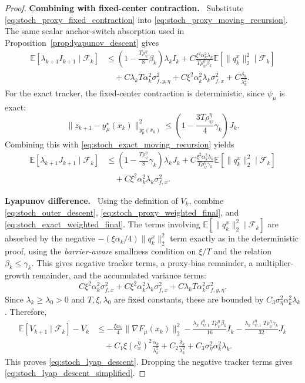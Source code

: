 \documentclass{article}
\newcommand{\proofstep}[1]{\par\smallskip\noindent\textbf{#1}\ }
\begin{document}
\begin{proof}
\proofstep{Combining with fixed-center contraction.}
Substitute \eqref{eq:stoch_proxy_fixed_contraction} into
\eqref{eq:stoch_proxy_moving_recursion}. The same scalar anchor-switch absorption used in
Proposition~\ref{prop:lyapunov_descent} gives
\begin{align}
\mathbb E[\lambda_{k+1}I_{k+1}\mid \mathcal F_k]
&\le
\left(1-\frac{T\rho_\psi^\eta}{8}\beta_k\right)\lambda_k I_k
+
C\frac{\xi^2\alpha_k^2\lambda_k}{T\rho_\psi^\eta\beta_k}
\mathbb E[\|q_k^x\|_2^2\mid\mathcal F_k]
\nonumber\\
&\quad
+
C\lambda_k T\alpha_k^2\sigma_{f,y,\eta}^2
+
C\xi^2\alpha_k^2\lambda_k\sigma_{f,x}^2
+
C\frac{\delta_k}{\lambda_k^2}.
\label{eq:stoch_proxy_weighted_final}
\end{align}
For the exact tracker, the fixed-center contraction is deterministic, since \(\psi_\mu\) is exact:
\[
\|z_{k+1}-y_\mu^\star(x_k)\|_{y_\mu^\star(x_k)}^2
\le
\left(1-\frac{3T\rho_\psi^\eta}{4}\gamma_k\right)J_k .
\]
Combining this with \eqref{eq:stoch_exact_moving_recursion} yields
\begin{align}
\mathbb E[\lambda_{k+1}J_{k+1}\mid \mathcal F_k]
&\le
\left(1-\frac{T\rho_\psi^\eta}{8}\gamma_k\right)\lambda_k J_k
+
C\frac{\xi^2\alpha_k^2\lambda_k}{T\rho_\psi^\eta\gamma_k}
\mathbb E[\|q_k^x\|_2^2\mid\mathcal F_k]
\nonumber\\
&\quad
+
C\xi^2\alpha_k^2\lambda_k\sigma_{f,x}^2 .
\label{eq:stoch_exact_weighted_final}
\end{align}

\proofstep{Lyapunov difference.}
Using the definition of \(V_k\), combine
\eqref{eq:stoch_outer_descent}, \eqref{eq:stoch_proxy_weighted_final}, and
\eqref{eq:stoch_exact_weighted_final}. The terms involving
\(\mathbb E[\|q_k^x\|_2^2\mid\mathcal F_k]\) are absorbed by the negative
\(-(\xi\alpha_k/4)\|q_k^x\|_2^2\) term exactly as in the deterministic proof, using the
\textit{barrier-aware} smallness condition on \(\xi/T\) and the relation \(\beta_k\le\gamma_k\). This gives
negative tracker terms, a proxy-bias remainder, a multiplier-growth remainder, and the accumulated
variance terms:
\[
C\xi^2\alpha_k^2\sigma_{f,x}^2
+
C\xi^2\alpha_k^2\lambda_k\sigma_{f,x}^2
+
C\lambda_kT\alpha_k^2\sigma_{f,y,\eta}^2 .
\]
Since \(\lambda_k\ge\lambda_0>0\) and \(T,\xi,\lambda_0\) are fixed constants, these are bounded by
\(C_3\sigma_\eta^2\alpha_k^2\lambda_k\). Therefore,
\begin{align*}
\mathbb E[V_{k+1}\mid \mathcal F_k]-V_k
&\le
-\frac{\xi\alpha_k}{4}\|\nabla F_\mu(x_k)\|_2^2
-\frac{\lambda_k\ell_{\psi,1}^\eta T\rho_\psi^\eta\beta_k}{16}I_k
-\frac{\lambda_k\ell_{\psi,1}^\eta T\rho_\psi^\eta\gamma_k}{32}J_k
\\
&\quad
+
C_1\xi(c_x^\eta)^2\frac{\alpha_k}{\lambda_k^2}
+
C_2\frac{\delta_k}{\lambda_k^2}
+
C_3\sigma_\eta^2\alpha_k^2\lambda_k .
\end{align*}
This proves \eqref{eq:stoch_lyap_descent}. Dropping the negative tracker terms gives
\eqref{eq:stoch_lyap_descent_simplified}.
\end{proof}
\end{document}
